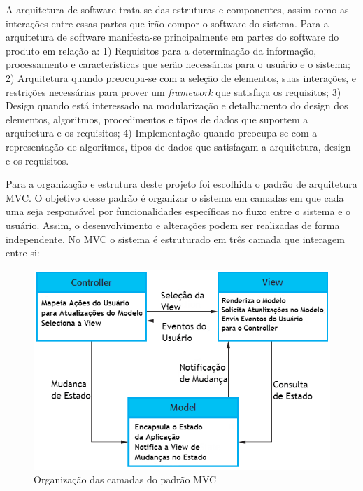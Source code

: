 A arquitetura de software trata-se das estruturas e componentes, assim como as interações entre essas partes que irão compor o software do sistema. Para \cite{Perry1992} a arquitetura de software manifesta-se principalmente em partes do software do produto em relação a: 1) Requisitos para a determinação da informação, processamento e características que serão necessárias para o usuário e o sistema; 2) Arquitetura quando preocupa-se com a seleção de elementos, suas interações, e restrições necessárias para prover um \textit{framework} que satisfaça os requisitos; 3) Design quando está interessado na modularização e detalhamento do design dos elementos, algoritmos, procedimentos e tipos de dados que suportem a arquitetura e os requisitos; 4) Implementação quando preocupa-se com a representação de algoritmos, tipos de dados que satisfaçam a arquitetura, design e os requisitos.

Para a organização e estrutura deste projeto foi escolhida o padrão de arquitetura \ac{MVC}. O objetivo desse padrão é organizar o sistema em camadas em que cada uma seja responsável por funcionalidades específicas no fluxo entre o sistema e o usuário. Assim, o desenvolvimento e alterações podem ser realizadas de forma independente. No \ac{MVC} o sistema é estruturado em três camada que interagem entre si:

\begin{figure}
	\centering
	\includegraphics[scale=0.60]{imagens/mvc.png}
	\caption{Organização das camadas do padrão MVC \citep{Sommerville2010}}
	\label{fig:mvc}
\end{figure}

